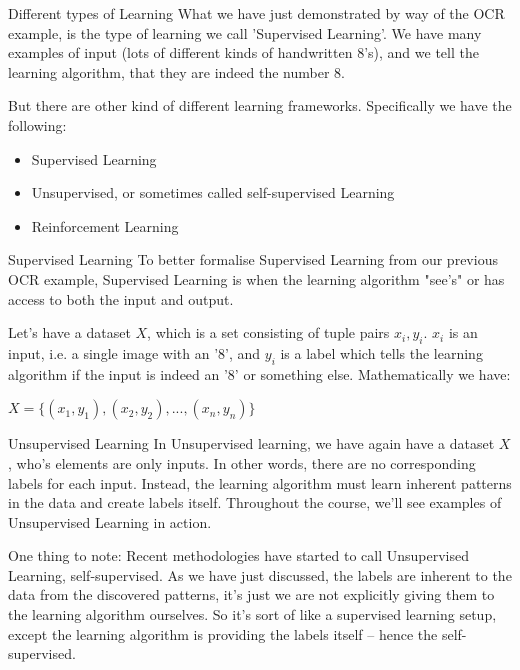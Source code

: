 \documentclass[10pt]{beamer}
\begin{document}
\begin{frame}[label={sec:org58d14cd}]{Different types of Learning}
What we have just demonstrated by way of the OCR example, is the type of learning we
call 'Supervised Learning'. We have many examples of input (lots of different kinds
of handwritten 8's), and we tell the learning algorithm, that they are indeed the
number 8.

But there are other kind of different learning frameworks. Specifically we have the
following:

\begin{itemize}
\item Supervised Learning
\item Unsupervised, or sometimes called self-supervised Learning
\item Reinforcement Learning
\end{itemize}
\end{frame}

\begin{frame}[label={sec:org2e52c8c}]{Supervised Learning}
To better formalise Supervised Learning from our previous OCR example, Supervised
Learning is when the learning algorithm "see's" or has access to both the input and
output.

Let's have a dataset \(X\), which is a set consisting of tuple pairs \(x_i, y_i\). \(x_i\)
is an input, i.e. a single image with an '8', and \(y_i\) is a label which tells the
learning algorithm if the input is indeed an '8' or something else. Mathematically we have:

\(X = \{(x_1, y_1), (x_2, y_2), ..., (x_n, y_n)\}\)
\end{frame}

\begin{frame}[label={sec:orgf9287a9}]{Unsupervised Learning}
In Unsupervised learning, we have again have a dataset \(X\), who's elements are only
inputs. In other words, there are no corresponding labels for each input. Instead,
the learning algorithm must learn inherent patterns in the data and create labels
itself. Throughout the course, we'll see examples of Unsupervised Learning in action.

One thing to note: Recent methodologies have started to call Unsupervised Learning,
self-supervised. As we have just discussed, the labels are inherent to the data from
the discovered patterns, it's just we are not explicitly giving them to the learning
algorithm ourselves. So it's sort of like a supervised learning setup, except the
learning algorithm is providing the labels itself -- hence the self-supervised.
\end{frame}
\end{document}
